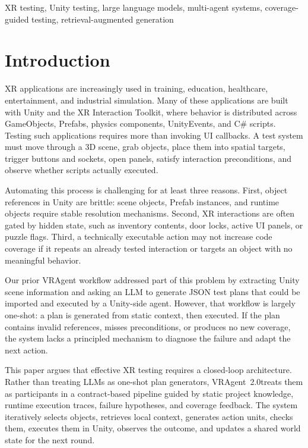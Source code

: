 \documentclass[10pt,conference]{IEEEtran}
\newcommand{\tool}{VRAgent~2.0}
\begin{document}
\begin{IEEEkeywords}
XR testing, Unity testing, large language models, multi-agent systems,
coverage-guided testing, retrieval-augmented generation
\end{IEEEkeywords}

\section{Introduction}

XR applications are increasingly used in training, education, healthcare,
entertainment, and industrial simulation. Many of these applications are built
with Unity and the XR Interaction Toolkit, where behavior is distributed across
GameObjects, Prefabs, physics components, UnityEvents, and C\# scripts. Testing
such applications requires more than invoking UI callbacks. A test system must
move through a 3D scene, grab objects, place them into spatial targets, trigger
buttons and sockets, open panels, satisfy interaction preconditions, and observe
whether scripts actually executed.

Automating this process is challenging for at least three reasons. First, object
references in Unity are brittle: scene objects, Prefab instances, and runtime
objects require stable resolution mechanisms. Second, XR interactions are often
gated by hidden state, such as inventory contents, door locks, active UI panels,
or puzzle flags. Third, a technically executable action may not increase code
coverage if it repeats an already tested interaction or targets an object with no
meaningful behavior.

Our prior VRAgent workflow addressed part of this problem by extracting Unity
scene information and asking an LLM to generate JSON test plans that could be
imported and executed by a Unity-side agent. However, that workflow is largely
one-shot: a plan is generated from static context, then executed. If the plan
contains invalid references, misses preconditions, or produces no new coverage,
the system lacks a principled mechanism to diagnose the failure and adapt the
next action.

This paper argues that effective XR testing requires a closed-loop architecture.
Rather than treating LLMs as one-shot plan generators, \tool treats them as
participants in a contract-based pipeline guided by static project knowledge,
runtime execution traces, failure hypotheses, and coverage feedback. The system
iteratively selects objects, retrieves local context, generates action units,
checks them, executes them in Unity, observes the outcome, and updates a shared
world state for the next round.
\end{document}
